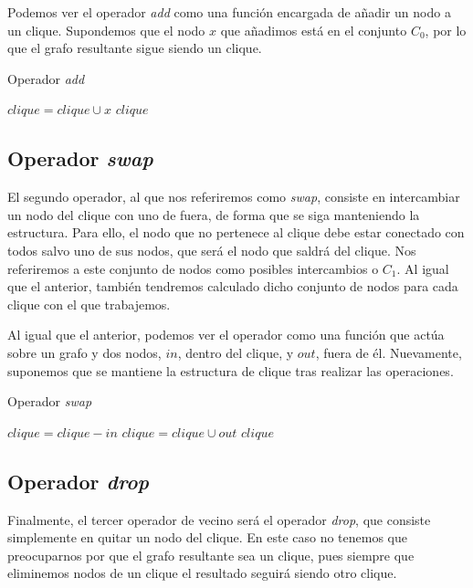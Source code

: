 Podemos ver el operador \textit{add} como una función encargada de añadir un nodo a un clique.
Supondemos que el nodo $x$ que añadimos está en el conjunto $C_0$, por lo que el grafo resultante
sigue siendo un clique.

\begin{algorithm}[H]
\caption{Operador \textit{add}}
  \begin{algorithmic}
    \State $clique = clique \cup x$
    \Return $clique$
  \EndFunction
  \end{algorithmic}
\end{algorithm}

\subsection{Operador \textit{swap}}

El segundo operador, al que nos referiremos como \textit{swap}, consiste en intercambiar un
nodo del clique con uno de fuera, de forma que se siga manteniendo la estructura. Para ello,
el nodo que no pertenece al clique debe estar conectado con todos salvo uno de sus nodos,
que será el nodo que saldrá del clique. Nos referiremos a este conjunto de nodos como posibles
intercambios o $C_1$. Al igual que el anterior, también tendremos calculado dicho conjunto de
nodos para cada clique con el que trabajemos.

Al igual que el anterior, podemos ver el operador como una función que actúa sobre un grafo y
dos nodos, $in$, dentro del clique, y $out$, fuera de él. Nuevamente, suponemos que se mantiene
la estructura de clique tras realizar las operaciones.

\begin{algorithm}[H]
\caption{Operador \textit{swap}}
  \begin{algorithmic}
    \State $clique = clique - in$
    \State $clique = clique \cup out$
    \Return $clique$
  \EndFunction
  \end{algorithmic}
\end{algorithm}

\subsection{Operador \textit{drop}}

Finalmente, el tercer operador de vecino será el operador \textit{drop}, que consiste simplemente en quitar
un nodo del clique. En este caso no tenemos que preocuparnos por que el grafo resultante sea un clique,
pues siempre que eliminemos nodos de un clique el resultado seguirá siendo otro clique.


